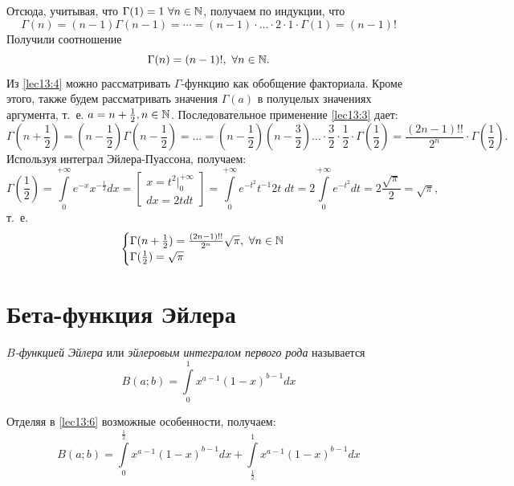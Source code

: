 \documentclass[../../main.tex]{subfiles}
\begin{document}
Отсюда, учитывая, что $\Gamma(1) = 1\ \forall n \in \N$, получаем по индукции, 
что
\[\Gamma(n) = (n-1)\Gamma(n-1) = \cdots = (n-1) \cdot \ldots \cdot 2 \cdot 1 
\cdot 
\Gamma(1) = (n-1)!\]
Получили соотношение
\begin{equation}
\label{lec13:4}
\Gamma(n) = (n-1)!,\ \forall n \in \mathbb{N}.
\end{equation}
Из \eqref{lec13:4} можно рассматривать $\Gamma$-функцию как обобщение 
факториала. Кроме этого, также будем рассматривать значения $\Gamma(a)$ в 
полуцелых значениях аргумента, т.~е. $a = {n + \frac{1}{2}}, {n \in \mathbb{N}}$.
Последовательное применение \eqref{lec13:3} дает:
\[
\Gamma\left(n + \frac{1}{2}\right) = \left(n - 
\frac{1}{2}\right)\Gamma\left(n-\frac{1}{2}\right)=\ldots=
\left(n-\frac{1}{2}\right)\left(n-\frac{3}{2}\right)\ldots\cdot \frac{3}{2} 
\cdot \frac{1}{2} \cdot \Gamma\left(\frac{1}{2}\right) 
= 
\frac{(2n-1)!!}{2^n}\cdot \Gamma\left(\frac{1}{2}\right).
\]
Используя интеграл Эйлера-Пуассона, получаем:
\[
\Gamma\left(\frac{1}{2}\right) = \int\limits_0^{+\infty} e^{-x} 
x^{-\frac{1}{2}} dx = \left[\begin{array}{l}
x = t^2|_0^{+\infty} \\ dx = 2tdt
\end{array}
\right] = 
\int\limits_0^{+\infty} e^{-t^2} t^{-1} 2t\; dt = 2 \int\limits_0^{+\infty} 
e^{-t^2} dt 
= 2 \frac{\sqrt{\pi}}{2} = \sqrt{\pi},
\]
т.~е.
\begin{equation}
	\label{lec13:5}
	\begin{cases}
		\Gamma(n+\frac{1}{2}) = \frac{(2n-1)!!}{2^n} \sqrt{\pi},\ \forall n \in \N \\
		\Gamma(\frac{1}{2}) = \sqrt{\pi}
	\end{cases}
\end{equation}

\section{Бета-функция Эйлера}
\emph{$B$-функцией Эйлера} или \emph{эйлеровым интегралом первого рода} 
называется
\begin{equation}
	\label{lec13:6}
	B(a; b) = \int\limits_0^1x^{a-1}(1-x)^{b-1}dx
\end{equation}

Отделяя в \eqref{lec13:6} возможные особенности, получаем:
\begin{equation}
	\label{lec13:7}
	B(a; b) = \int\limits_0^{\frac{1}{2}} 
	x^{a-1} (1-x)^{b-1}dx + \int\limits_{\frac{1}{2}}^{1} 
	x^{a-1}(1-x)^{b-1}dx
\end{equation}
\end{document}
